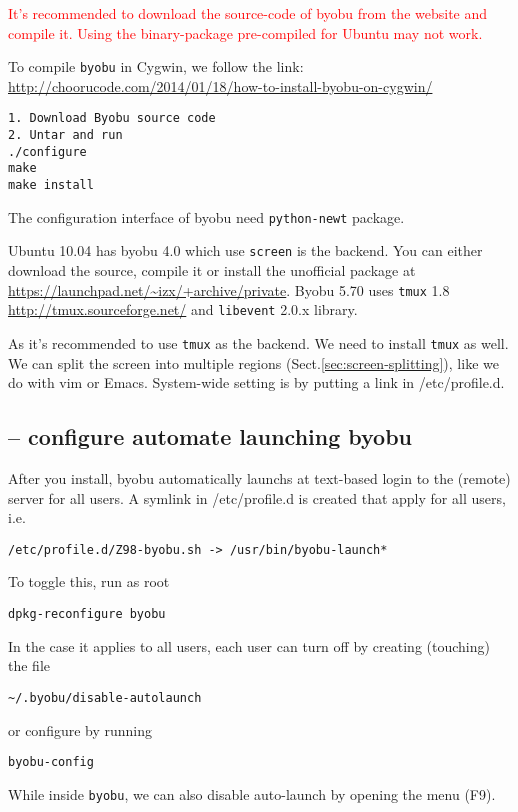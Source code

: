 \textcolor{red}{It's recommended to download the source-code of byobu from the
website and compile it. Using the binary-package pre-compiled for Ubuntu may not
work.}

To compile \verb!byobu! in Cygwin, we follow the link:
\url{http://choorucode.com/2014/01/18/how-to-install-byobu-on-cygwin/}
\begin{verbatim}
1. Download Byobu source code
2. Untar and run
./configure
make 
make install
\end{verbatim}
The configuration interface of byobu need \verb!python-newt! package.

Ubuntu 10.04 has byobu 4.0 which use \verb!screen! is the backend.
You can either download the source, compile it or install the unofficial package at
\url{https://launchpad.net/~izx/+archive/private}. Byobu 5.70 uses \verb!tmux!
1.8 \url{http://tmux.sourceforge.net/} and \verb!libevent! 2.0.x library.

As it's recommended to use \verb!tmux! as the backend. We need to install
\verb!tmux! as well. We can split the screen into multiple regions
(Sect.\ref{sec:screen-splitting}), like we do with vim or Emacs. System-wide
setting is by putting a link in /etc/profile.d.

\subsection{-- configure automate launching byobu}
\label{sec:byobu-automate-launch}

After you install, byobu automatically launchs at text-based login to the
(remote) server for all users. A symlink in /etc/profile.d is created that
apply for all users, i.e.
\begin{verbatim}
/etc/profile.d/Z98-byobu.sh -> /usr/bin/byobu-launch*
\end{verbatim}
To toggle this, run as root
\begin{verbatim}
dpkg-reconfigure byobu
\end{verbatim}

In the case it applies to all users, each user can turn off by creating
(touching) the file
\begin{verbatim}
~/.byobu/disable-autolaunch
\end{verbatim}
or configure by running
\begin{verbatim}
byobu-config
\end{verbatim}
While inside \verb!byobu!, we can also disable auto-launch by opening the menu
(F9).


